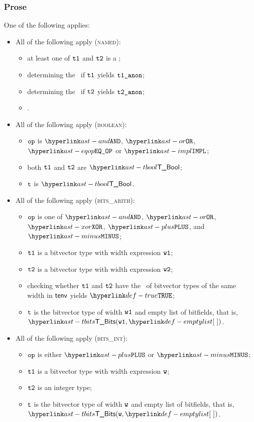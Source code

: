\subsubsection{Prose}
One of the following applies:
\begin{itemize}
  \item All of the following apply (\textsc{named}):
  \begin{itemize}
    \item at least one of $\texttt{t1}$ and $\texttt{t2}$ is a \namedtype;
    \item determining the \underlyingtype\ if $\texttt{t1}$ yields $\vtoneanon$\ProseOrTypeError;
    \item determining the \underlyingtype\ if $\texttt{t2}$ yields $\vttwoanon$\ProseOrTypeError;
    \item \Proseapplybinoptypes{$\tenv$}{$\op$}{$\vtoneanon$}{$\vttwoanon$}{$\vt$\ProseOrTypeError}.
  \end{itemize}

  \item All of the following apply (\textsc{boolean}):
  \begin{itemize}
    \item $\op$ is $\AND$, $\OR$, $\EQOP$ or $\IMPL$;
    \item both $\texttt{t1}$ and $\texttt{t2}$ are $\TBool$;
    \item $\vt$ is $\TBool$.
  \end{itemize}

  \item All of the following apply (\textsc{bits\_arith}):
  \begin{itemize}
    \item $\op$ is one of $\AND$, $\OR$, $\XOR$, $\PLUS$, and $\MINUS$;
    \item $\texttt{t1}$ is a bitvector type with width expression $\texttt{w1}$;
    \item $\texttt{t2}$ is a bitvector type with width expression $\texttt{w2}$;
    \item checking whether $\texttt{t1}$ and $\texttt{t2}$ have the \structure\ of bitvector types
          of the same width in $\tenv$ yields $\True$\ProseOrTypeError;
    \item $\vt$ is the bitvector type of width $\texttt{w1}$ and empty list of bitfields, that is, \\ $\TBits(\vwone, \emptylist)$.
  \end{itemize}

  \item All of the following apply (\textsc{bits\_int}):
  \begin{itemize}
    \item $\op$ is either $\PLUS$ or $\MINUS$;
    \item $\texttt{t1}$ is a bitvector type with width expression $\texttt{w}$;
    \item $\texttt{t2}$ is an integer type;
    \item $\vt$ is the bitvector type of width $\texttt{w}$ and empty list of bitfields, that is, \\ $\TBits(\vw, \emptylist)$.
  \end{itemize}


\end{itemize}
